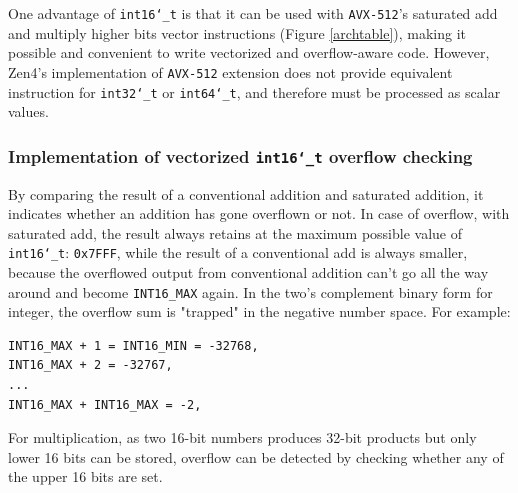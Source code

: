 \documentclass[logo,bsc,singlespacing,parskip]{infthesis}
\newcommand{\dtshort}{\texttt{int16\char`_t}}
\newcommand{\dtint}{\texttt{int32\char`_t}}
\newcommand{\dtlong}{\texttt{int64\char`_t}}
\begin{document}

One advantage of \dtshort{} is that it can be used with \texttt{AVX-512}'s
saturated add and multiply higher bits vector instructions (Figure 
\ref{archtable}), making it possible and convenient to write vectorized and
overflow-aware code. However, Zen4's implementation of \texttt{AVX-512} extension does
not provide equivalent instruction for \dtint{} or \dtlong{},
and therefore must be processed as scalar values.


\subsubsection{Implementation of vectorized \dtshort{} overflow checking}
\label{sec:i16-overflow-checking}
By comparing the result of a conventional addition and saturated addition, it
indicates whether an addition has gone overflown or not. In case of overflow,
with saturated add, the result always retains at the maximum possible value of
\dtshort{}: \texttt{0x7FFF}, while the result of a conventional add is
always smaller, because the overflowed output from conventional addition can't
go all the way around and become \texttt{INT16\_MAX} again. In the two's
complement binary form for integer, the overflow sum is "trapped" in the
negative number space. For example: 
\begin{verbatim}
INT16_MAX + 1 = INT16_MIN = -32768, 
INT16_MAX + 2 = -32767, 
...
INT16_MAX + INT16_MAX = -2, 
\end{verbatim}

For multiplication, as two 16-bit numbers produces 32-bit products but only
lower 16 bits can be stored, overflow can be detected by checking whether any of
the upper 16 bits are set. 
\end{document}
